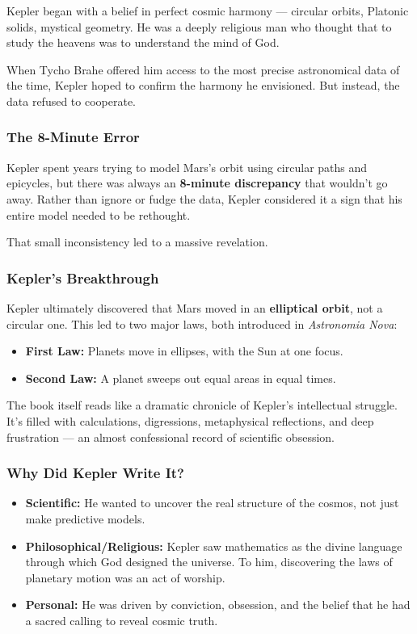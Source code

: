Kepler began with a belief in perfect cosmic harmony — circular orbits, Platonic solids, mystical geometry. He was a deeply religious man who thought that to study the heavens was to understand the mind of God.

When Tycho Brahe offered him access to the most precise astronomical data of the time, Kepler hoped to confirm the harmony he envisioned. But instead, the data refused to cooperate.

\subsubsection{The 8-Minute Error}

Kepler spent years trying to model Mars’s orbit using circular paths and epicycles, but there was always an \textbf{8-minute discrepancy} that wouldn’t go away. Rather than ignore or fudge the data, Kepler considered it a sign that his entire model needed to be rethought.

That small inconsistency led to a massive revelation.

\subsubsection{Kepler’s Breakthrough}

Kepler ultimately discovered that Mars moved in an \textbf{elliptical orbit}, not a circular one. This led to two major laws, both introduced in \textit{Astronomia Nova}:

\begin{itemize}
  \item \textbf{First Law:} Planets move in ellipses, with the Sun at one focus.
  \item \textbf{Second Law:} A planet sweeps out equal areas in equal times.
\end{itemize}

The book itself reads like a dramatic chronicle of Kepler’s intellectual struggle. It’s filled with calculations, digressions, metaphysical reflections, and deep frustration — an almost confessional record of scientific obsession.

\subsubsection{Why Did Kepler Write It?}

\begin{itemize}
  \item \textbf{Scientific:} He wanted to uncover the real structure of the cosmos, not just make predictive models.
  \item \textbf{Philosophical/Religious:} Kepler saw mathematics as the divine language through which God designed the universe. To him, discovering the laws of planetary motion was an act of worship.
  \item \textbf{Personal:} He was driven by conviction, obsession, and the belief that he had a sacred calling to reveal cosmic truth.
\end{itemize}

